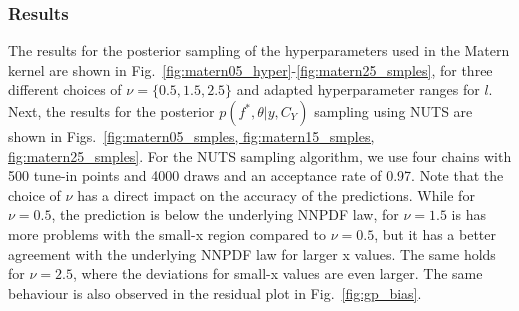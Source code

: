 \documentclass[11pt,a4paper]{article}
\begin{document}
\subsubsection{Results}
The results for the posterior sampling of the hyperparameters used in the Matern kernel are shown in Fig.~\ref{fig:matern05_hyper}-\ref{fig:matern25_smples}, for three different choices of $\nu = \{0.5, 1.5, 2.5\}$ and adapted hyperparameter ranges for $l$. Next, the results for the posterior $p(f^*, \theta|y, C_Y)$ sampling using NUTS are shown in Figs.~\ref{fig:matern05_smples, fig:matern15_smples, fig:matern25_smples}. For the NUTS sampling algorithm, we use four chains with 500 tune-in points and 4000 draws and an acceptance rate of 0.97. Note that the choice of $\nu$ has a direct impact on the accuracy of the predictions. While for $\nu =0.5$, the prediction is below the underlying NNPDF law, for $\nu=1.5$ is has more problems with the small-x region compared to $\nu=0.5$, but it has a better agreement with the underlying NNPDF law for larger x values. The same holds for $\nu=2.5$, where the deviations for small-x values are even larger. The same behaviour is also observed in the residual plot in Fig.~\ref{fig:gp_bias}.
%
%
%
%
%
%
\end{document}
